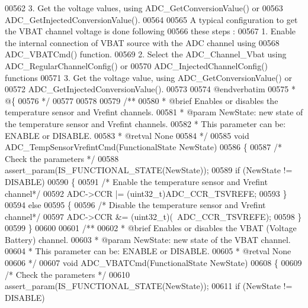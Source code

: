 \begin{DoxyCode}
00562 \textcolor{comment}{   3. Get the voltage values, using ADC\_GetConversionValue() or  }
00563 \textcolor{comment}{      ADC\_GetInjectedConversionValue().}
00564 \textcolor{comment}{}
00565 \textcolor{comment}{  A typical configuration to get the VBAT channel voltage is done following }
00566 \textcolor{comment}{  these steps :}
00567 \textcolor{comment}{   1. Enable the internal connection of VBAT source with the ADC channel using }
00568 \textcolor{comment}{      ADC\_VBATCmd() function. }
00569 \textcolor{comment}{   2. Select the ADC\_Channel\_Vbat using ADC\_RegularChannelConfig() or  }
00570 \textcolor{comment}{      ADC\_InjectedChannelConfig() functions }
00571 \textcolor{comment}{   3. Get the voltage value, using ADC\_GetConversionValue() or  }
00572 \textcolor{comment}{      ADC\_GetInjectedConversionValue().}
00573 \textcolor{comment}{ }
00574 \textcolor{comment}{@endverbatim}
00575 \textcolor{comment}{  * @\{}
00576 \textcolor{comment}{  */}
00577 
00578 
00579 \textcolor{comment}{/**}
00580 \textcolor{comment}{  * @brief  Enables or disables the temperature sensor and Vrefint channels.}
00581 \textcolor{comment}{  * @param  NewState: new state of the temperature sensor and Vrefint channels.}
00582 \textcolor{comment}{  *          This parameter can be: ENABLE or DISABLE.}
00583 \textcolor{comment}{  * @retval None}
00584 \textcolor{comment}{  */}
00585 \textcolor{keywordtype}{void} ADC_TempSensorVrefintCmd(FunctionalState NewState)
00586 \{
00587   \textcolor{comment}{/* Check the parameters */}
00588   assert_param(IS\_FUNCTIONAL\_STATE(NewState));
00589   \textcolor{keywordflow}{if} (NewState != DISABLE)
00590   \{
00591     \textcolor{comment}{/* Enable the temperature sensor and Vrefint channel*/}
00592     ADC->CCR |= (uint32\_t)ADC_CCR_TSVREFE;
00593   \}
00594   \textcolor{keywordflow}{else}
00595   \{
00596     \textcolor{comment}{/* Disable the temperature sensor and Vrefint channel*/}
00597     ADC->CCR &= (uint32\_t)(~ADC_CCR_TSVREFE);
00598   \}
00599 \}
00600 
00601 \textcolor{comment}{/**}
00602 \textcolor{comment}{  * @brief  Enables or disables the VBAT (Voltage Battery) channel.}
00603 \textcolor{comment}{  * @param  NewState: new state of the VBAT channel.}
00604 \textcolor{comment}{  *          This parameter can be: ENABLE or DISABLE.}
00605 \textcolor{comment}{  * @retval None}
00606 \textcolor{comment}{  */}
00607 \textcolor{keywordtype}{void} ADC_VBATCmd(FunctionalState NewState)
00608 \{
00609   \textcolor{comment}{/* Check the parameters */}
00610   assert_param(IS\_FUNCTIONAL\_STATE(NewState));
00611   \textcolor{keywordflow}{if} (NewState != DISABLE)

\end{DoxyCode}
